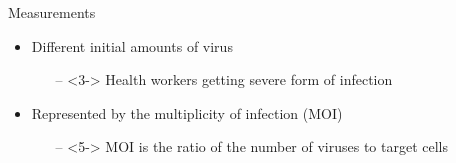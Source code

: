 \documentclass{beamer}
\begin{document}
\begin{frame}{Measurements}

    \begin{itemize}
        \item<2-> Different initial amounts of virus
            \begin{itemize}
                \item[--]<3-> Health workers getting severe form of infection
            \end{itemize}
        \item<4-> Represented by the multiplicity of infection (MOI)
            \begin{itemize}
                \item[--]<5-> MOI is the ratio of the number of viruses to target cells
            \end{itemize}
    \end{itemize}

    \begin{center}
    \end{center}

\end{frame}
\end{document}
